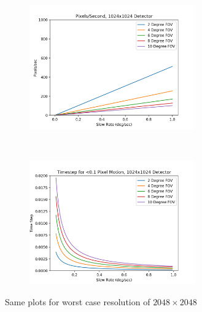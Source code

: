 \documentclass[]{DINOReportMemo}
\begin{document}
\begin{figure}[t!]
    \centering
    \begin{subfigure}
        \centering
        \includegraphics[height=2.1in]{1024x1024_pix_per_sec}
    \end{subfigure}%
    ~ 
    \begin{subfigure}
        \centering
        \includegraphics[height=2.1in]{1024x1024_min_dt}
    \end{subfigure}
    \caption{Same plots for worst case resolution of $2048\times2048$}
    \label{1024}
\end{figure}
\end{document}
